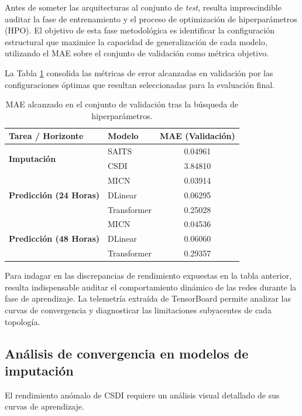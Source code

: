 Antes de someter las arquitecturas al conjunto de \textit{test}, resulta imprescindible auditar la fase de entrenamiento y el proceso de optimización de hiperparámetros (HPO). El objetivo de esta fase metodológica es identificar la configuración estructural que maximice la capacidad de generalización de cada modelo, utilizando el MAE sobre el conjunto de validación como métrica objetivo.

La Tabla \ref{tab:resultados_validacion} consolida las métricas de error alcanzadas en validación por las configuraciones óptimas que resultan seleccionadas para la evaluación final.

\begin{table}[H]
	\centering
	\caption{MAE alcanzado en el conjunto de validación tras la búsqueda de hiperparámetros.}
	\label{tab:resultados_validacion}
	\begin{tabular}{llc}
		\toprule
		\textbf{Tarea / Horizonte} & \textbf{Modelo} & \textbf{MAE (Validación)} \\
		\midrule
		\multirow{2}{*}{\textbf{Imputación}} & SAITS & 0.04961 \\
		& CSDI & 3.84810 \\
		\midrule
		\multirow{3}{*}{\textbf{Predicción (24 Horas)}} & MICN & 0.03914 \\
		& DLinear & 0.06295 \\
		& Transformer & 0.25028 \\
		\midrule
		\multirow{3}{*}{\textbf{Predicción (48 Horas)}} & MICN & 0.04536 \\
		& DLinear & 0.06060 \\
		& Transformer & 0.29357 \\
		\bottomrule
	\end{tabular}
\end{table}

Para indagar en las discrepancias de rendimiento expuestas en la tabla anterior, resulta indispensable auditar el comportamiento dinámico de las redes durante la fase de aprendizaje. La telemetría extraída de TensorBoard permite analizar las curvas de convergencia y diagnosticar las limitaciones subyacentes de cada topología.

\subsection{Análisis de convergencia en modelos de imputación}

El rendimiento anómalo de CSDI requiere un análisis visual detallado de sus curvas de aprendizaje.

